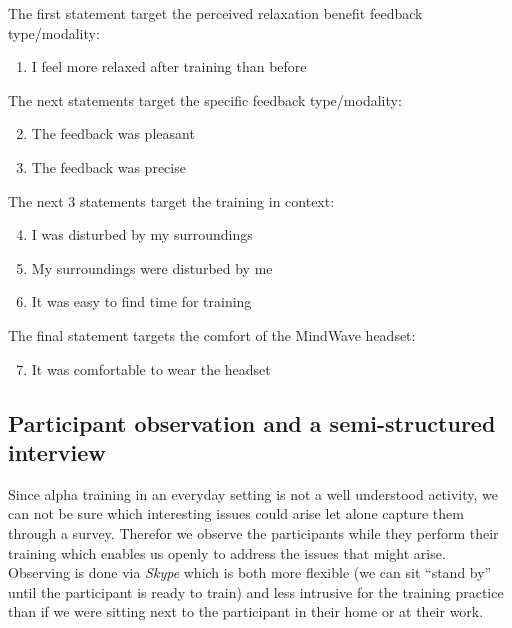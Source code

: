\documentclass[a4paper,10pt,english,lof,lot,twoside]{puthesis}
\begin{document}
The first statement target the perceived relaxation benefit feedback type/modality:
\begin{enumerate}
\item {} 
I feel more relaxed after training than before

\end{enumerate}

The next statements target the specific feedback type/modality:
\begin{enumerate}
\setcounter{enumi}{1}
\item {} 
The feedback was pleasant

\item {} 
The feedback was precise

\end{enumerate}

The next 3 statements target the training in context:
\begin{enumerate}
\setcounter{enumi}{3}
\item {} 
I was disturbed by my surroundings

\item {} 
My surroundings were disturbed by me

\item {} 
It was easy to find time for training

\end{enumerate}

The final statement targets the comfort of the MindWave headset:
\begin{enumerate}
\setcounter{enumi}{6}
\item {} 
It was comfortable to wear the headset

\end{enumerate}


\subsection{Participant observation and a semi-structured interview}
\label{ch-evaluation/index:participant-observation-and-a-semi-structured-interview}
Since alpha training in an everyday setting is not a well understood activity, we can not be sure which interesting issues could arise let alone capture them through a survey. Therefor we observe the participants while they perform their training which enables us openly to address the issues that might arise. Observing is done via \emph{Skype} which is both more flexible (we can sit ``stand by'' until the participant is ready to train) and less intrusive for the training practice than if we were sitting next to the participant in their home or at their work.
\end{document}
